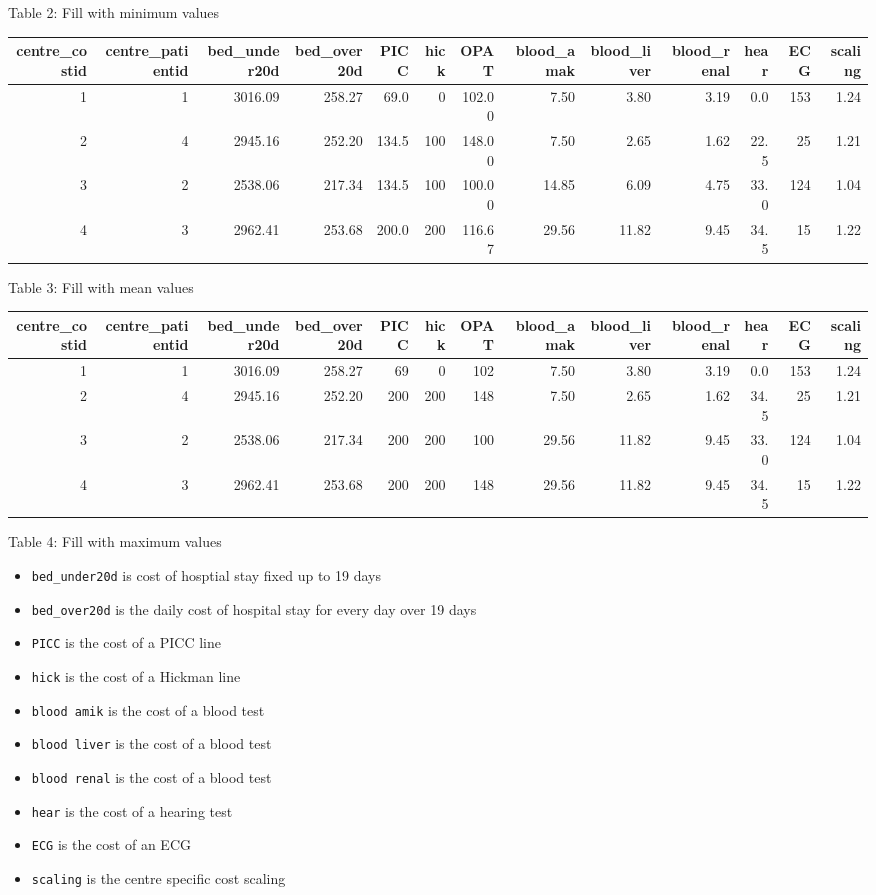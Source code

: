 \documentclass[]{article}
\providecommand{\tightlist}{%
  \setlength{\itemsep}{0pt}\setlength{\parskip}{0pt}}
\begin{document}
Table 2: Fill with minimum values

\begin{longtable}[]{@{}rrrrrrrrrrrrr@{}}
\toprule
centre\_costid & centre\_patientid & bed\_under20d & bed\_over20d & PICC
& hick & OPAT & blood\_amak & blood\_liver & blood\_renal & hear & ECG &
scaling\tabularnewline
\midrule
\endhead
1 & 1 & 3016.09 & 258.27 & 69.0 & 0 & 102.00 & 7.50 & 3.80 & 3.19 & 0.0
& 153 & 1.24\tabularnewline
2 & 4 & 2945.16 & 252.20 & 134.5 & 100 & 148.00 & 7.50 & 2.65 & 1.62 &
22.5 & 25 & 1.21\tabularnewline
3 & 2 & 2538.06 & 217.34 & 134.5 & 100 & 100.00 & 14.85 & 6.09 & 4.75 &
33.0 & 124 & 1.04\tabularnewline
4 & 3 & 2962.41 & 253.68 & 200.0 & 200 & 116.67 & 29.56 & 11.82 & 9.45 &
34.5 & 15 & 1.22\tabularnewline
\bottomrule
\end{longtable}

Table 3: Fill with mean values

\begin{longtable}[]{@{}rrrrrrrrrrrrr@{}}
\toprule
centre\_costid & centre\_patientid & bed\_under20d & bed\_over20d & PICC
& hick & OPAT & blood\_amak & blood\_liver & blood\_renal & hear & ECG &
scaling\tabularnewline
\midrule
\endhead
1 & 1 & 3016.09 & 258.27 & 69 & 0 & 102 & 7.50 & 3.80 & 3.19 & 0.0 & 153
& 1.24\tabularnewline
2 & 4 & 2945.16 & 252.20 & 200 & 200 & 148 & 7.50 & 2.65 & 1.62 & 34.5 &
25 & 1.21\tabularnewline
3 & 2 & 2538.06 & 217.34 & 200 & 200 & 100 & 29.56 & 11.82 & 9.45 & 33.0
& 124 & 1.04\tabularnewline
4 & 3 & 2962.41 & 253.68 & 200 & 200 & 148 & 29.56 & 11.82 & 9.45 & 34.5
& 15 & 1.22\tabularnewline
\bottomrule
\end{longtable}

Table 4: Fill with maximum values

\begin{itemize}
\tightlist
\item
  \texttt{bed\_under20d} is cost of hosptial stay fixed up to 19 days
\item
  \texttt{bed\_over20d} is the daily cost of hospital stay for every day
  over 19 days
\item
  \texttt{PICC} is the cost of a PICC line
\item
  \texttt{hick} is the cost of a Hickman line
\item
  \texttt{blood\ amik} is the cost of a blood test
\item
  \texttt{blood\ liver} is the cost of a blood test
\item
  \texttt{blood\ renal} is the cost of a blood test
\item
  \texttt{hear} is the cost of a hearing test
\item
  \texttt{ECG} is the cost of an ECG
\item
  \texttt{scaling} is the centre specific cost scaling
\end{itemize}
\end{document}

